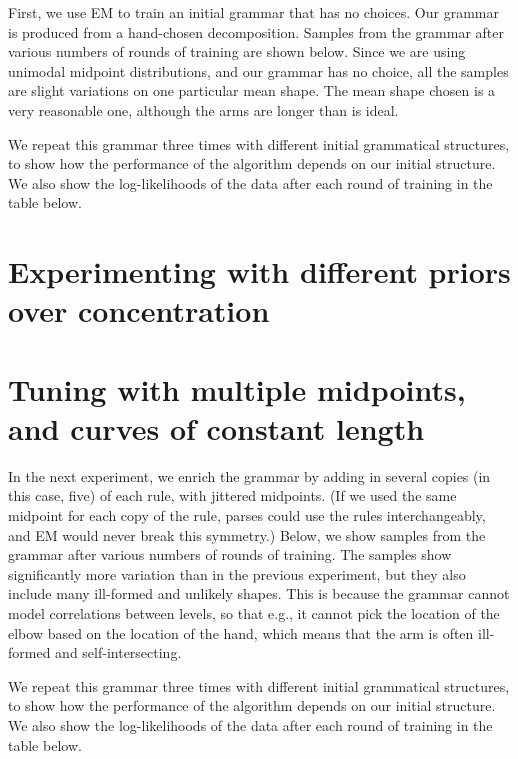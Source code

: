 \documentclass{book}
\begin{document}
First, we use EM to train an initial grammar that has no choices. Our
grammar is produced from a hand-chosen decomposition. Samples from the
grammar after various numbers of rounds of training are shown
below. Since we are using unimodal midpoint distributions, and our
grammar has no choice, all the samples are slight variations on one
particular mean shape. The mean shape chosen is a very reasonable one,
although the arms are longer than is ideal.

We repeat this grammar three times with different initial grammatical
structures, to show how the performance of the algorithm depends on
our initial structure. We also show the log-likelihoods of the data
after each round of training in the table below.



\section{Experimenting with different priors over concentration}



\section{Tuning with multiple midpoints, and curves of constant length}

In the next experiment, we enrich the grammar by adding in several
copies (in this case, five) of each rule, with jittered midpoints. (If
we used the same midpoint for each copy of the rule, parses could use
the rules interchangeably, and EM would never break this symmetry.)
Below, we show samples from the grammar after various numbers of
rounds of training. The samples show significantly more variation than
in the previous experiment, but they also include many ill-formed and
unlikely shapes. This is because the grammar cannot model correlations
between levels, so that e.g., it cannot pick the location of the elbow
based on the location of the hand, which means that the arm is often
ill-formed and self-intersecting.

We repeat this grammar three times with different initial grammatical
structures, to show how the performance of the algorithm depends on
our initial structure. We also show the log-likelihoods of the data
after each round of training in the table below.


\end{document}
